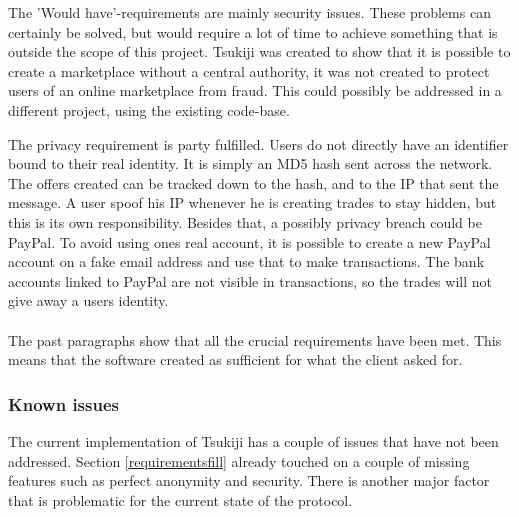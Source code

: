 The 'Would have'-requirements are mainly security issues.
These problems can certainly be solved, but would require a lot of time to achieve something that is outside the scope of this project.
Tsukiji was created to show that it is possible to create a marketplace without a central authority, it was not created to protect users of an online marketplace from fraud.
This could possibly be addressed in a different project, using the existing code-base.

The privacy requirement is party fulfilled. Users do not directly have an identifier bound to their real identity.
It is simply an MD5 hash sent across the network.
The offers created can be tracked down to the hash, and to the IP that sent the message.
A user spoof his IP whenever he is creating trades to stay hidden, but this is its own responsibility.
Besides that, a possibly privacy breach could be PayPal.
To avoid using ones real account, it is possible to create a new PayPal account on a fake email address and use that to make transactions.
The bank accounts linked to PayPal are not visible in transactions, so the trades will not give away a users identity.\\
\\
The past paragraphs show that all the crucial requirements have been met.
This means that the software created as sufficient for what the client asked for.

\subsubsection{Known issues}
The current implementation of Tsukiji has a couple of issues that have not been addressed.
Section \ref{requirementsfill} already touched on a couple of missing features such as perfect anonymity and security.
There is another major factor that is problematic for the current state of the protocol.

